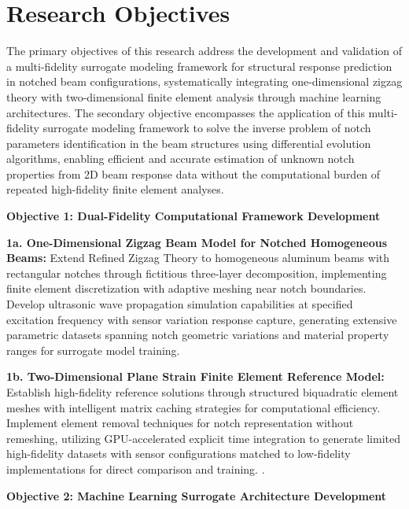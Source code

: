 \documentclass[12pt,a4paper]{report}
\begin{document}
\section{Research Objectives}

The primary objectives of this research address the development and validation of a multi-fidelity surrogate modeling framework for structural response prediction in notched beam configurations, systematically integrating one-dimensional zigzag theory with two-dimensional finite element analysis through machine learning architectures. The secondary objective encompasses the application of this multi-fidelity surrogate modeling framework to solve the inverse problem of notch parameters identification in the beam structures using differential evolution algorithms, enabling efficient and accurate estimation of unknown notch properties from 2D beam response data without the computational burden of repeated high-fidelity finite element analyses.

\bigskip

\noindent\textbf{Objective 1: Dual-Fidelity Computational Framework Development}

\medskip

\textbf{1a. One-Dimensional Zigzag Beam Model for Notched Homogeneous Beams:} Extend Refined Zigzag Theory to homogeneous aluminum beams with rectangular notches through fictitious three-layer decomposition, implementing finite element discretization with adaptive meshing near notch boundaries. Develop ultrasonic wave propagation simulation capabilities at specified excitation frequency with sensor variation response capture, generating extensive parametric datasets spanning notch geometric variations and material property ranges for surrogate model training.

\medskip

\textbf{1b. Two-Dimensional Plane Strain Finite Element Reference Model:} Establish high-fidelity reference solutions through structured biquadratic element meshes with intelligent matrix caching strategies for computational efficiency. Implement element removal techniques for notch representation without remeshing, utilizing GPU-accelerated explicit time integration to generate limited high-fidelity datasets with sensor configurations matched to low-fidelity implementations for direct comparison and training. .

\bigskip

\textbf{Objective 2: Machine Learning Surrogate Architecture Development}
\end{document}
